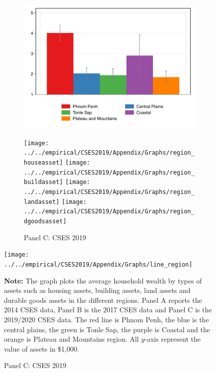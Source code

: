 \documentclass[11pt,letterpaper]{article}
\begin{document}
\begin{figure}[H]
\begin{subfigure}[b]{0.33\linewidth}
		\includegraphics[width=1\linewidth]{../../empirical/CSES2017/Appendix/Graphs/region_dgoodsasset} 
		\vspace{-2.5em}
		\newline {}
	\end{subfigure}
	\hfil
	\begin{subfigure}[b]{0.33\linewidth}
		\caption*{Panel C: CSES 2019} \vspace{-.5em}
		\label{fig:3c}
		\texttt{[image: ../../empirical/CSES2019/Appendix/Graphs/region\_houseasset]} 
		\vspace{-2.5em}
		\newline {}
		\texttt{[image: ../../empirical/CSES2019/Appendix/Graphs/region\_buildasset]} 
		\vspace{-2.5em}
		\newline {}
		\texttt{[image: ../../empirical/CSES2019/Appendix/Graphs/region\_landasset]} 
		\vspace{-2.5em}
		\newline {}
		\texttt{[image: ../../empirical/CSES2019/Appendix/Graphs/region\_dgoodsasset]} 
		\vspace{-2.5em}
		\newline {}
	\end{subfigure}
		\texttt{[image: ../../empirical/CSES2019/Appendix/Graphs/line\_region]} 
	
	\begin{tablenotes}
		\footnotesize
		\item \textbf{Note:} The graph plots the average household wealth by types of assets such as housing assets, building assets, land assets and durable goods assets in the different regions. Panel A reports the 2014 CSES data, Panel B is the 2017 CSES data and Panel C is the 2019/2020 CSES data. The red line is Phnom Penh, the blue is the central plains, the green is Tonle Sap, the purple is Coastal and the orange is Plateau and Mountains region. All $y$-axis represent the value of assets in \$1,000.
	\end{tablenotes} 
\end{figure}
\end{document}
